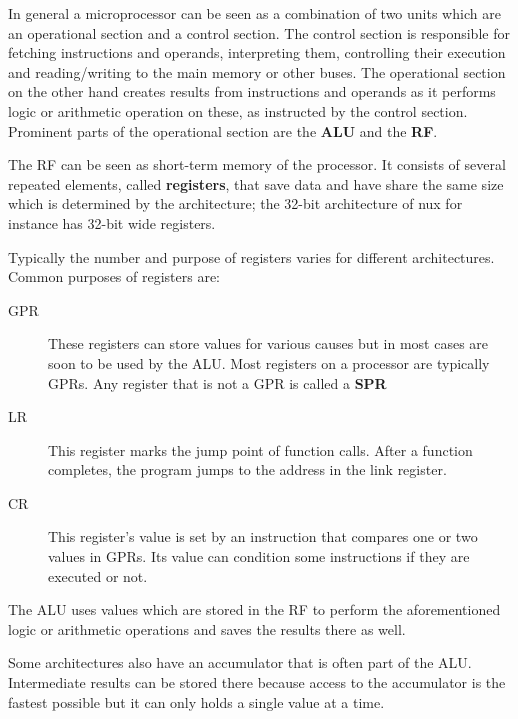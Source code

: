 In general a microprocessor can be seen as a combination of two units which are an operational section and a control section.
The control section is responsible for fetching instructions and operands, interpreting them, controlling their execution and reading/writing to the main memory or other buses.
The operational section on the other hand creates results from instructions and operands as it performs logic or arithmetic operation on these, as instructed by the control section.
Prominent parts of the operational section are the \textbf{\ac{ALU}} and the \textbf{\ac{RF}}.

The \ac{RF} can be seen as short-term memory of the processor.
It consists of several repeated elements, called \textbf{registers}, that save data and have share the same size which is determined by the architecture; the 32-bit architecture of nux for instance has 32-bit wide registers.

Typically the number and purpose of registers varies for different architectures.
Common purposes of registers are:
\begin{description}
    \item[\ac{GPR}] These registers can store values for various causes but in most cases are soon to be used by the ALU. Most registers on a processor are typically \ac{GPR}s.
        Any register that is not a \ac{GPR} is called a \textbf{\ac{SPR}}
    \item[\ac{LR}] This register marks the jump point of function calls. After a function completes, the program jumps to the address in the link register.
    \item[\ac{CR}] This register's value is set by an instruction that compares one or two values in GPRs. Its value can condition some instructions if they are executed or not.
\end{description}        
The \ac{ALU} uses values which are stored in the \ac{RF} to perform the aforementioned logic or arithmetic operations and saves the results there as well.

Some architectures also have an accumulator that is often part of the \ac{ALU}.
Intermediate results can be stored there because access to the accumulator is the fastest possible but it can only holds a single value at a time.
\\
\\

